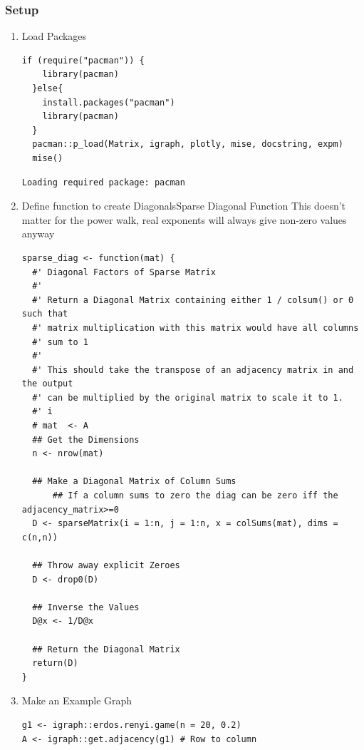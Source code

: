 \documentclass[11pt]{article}
\begin{document}
\subsubsection{Setup}
\label{sec:org4d9540f}
\begin{enumerate}
\item Load Packages
\label{sec:orgd6876e6}
\lstset{language=r,label= ,caption= ,captionpos=b,numbers=none}
\begin{lstlisting}
if (require("pacman")) {
    library(pacman)
  }else{
    install.packages("pacman")
    library(pacman)
  }
  pacman::p_load(Matrix, igraph, plotly, mise, docstring, expm)
  mise()
\end{lstlisting}

\begin{verbatim}
Loading required package: pacman
\end{verbatim}

\item Define function to create DiagonalsSparse Diagonal Function
\label{sec:orge497e1b}
This doesn't matter for the power walk, real exponents will always give non-zero values anyway
\lstset{language=r,label= ,caption= ,captionpos=b,numbers=none}
\begin{lstlisting}
sparse_diag <- function(mat) {
  #' Diagonal Factors of Sparse Matrix
  #'
  #' Return a Diagonal Matrix containing either 1 / colsum() or 0 such that
  #' matrix multiplication with this matrix would have all columns
  #' sum to 1
  #'
  #' This should take the transpose of an adjacency matrix in and the output
  #' can be multiplied by the original matrix to scale it to 1.
  #' i
  # mat  <- A
  ## Get the Dimensions
  n <- nrow(mat)

  ## Make a Diagonal Matrix of Column Sums
      ## If a column sums to zero the diag can be zero iff the adjacency_matrix>=0
  D <- sparseMatrix(i = 1:n, j = 1:n, x = colSums(mat), dims = c(n,n))

  ## Throw away explicit Zeroes
  D <- drop0(D)

  ## Inverse the Values
  D@x <- 1/D@x

  ## Return the Diagonal Matrix
  return(D)
}
\end{lstlisting}

\item Make an Example Graph
\label{sec:orgd009706}
\lstset{language=r,label= ,caption= ,captionpos=b,numbers=none}
\begin{lstlisting}
g1 <- igraph::erdos.renyi.game(n = 20, 0.2)
A <- igraph::get.adjacency(g1) # Row to column


\end{lstlisting}
\end{enumerate}
\end{document}
